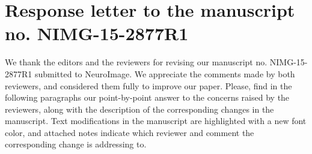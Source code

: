 \documentclass[9pt]{memoir}
\begin{document}
\hypersetup{linkcolor=black!60, citecolor=black!60, urlcolor=black!60}

\section*{Response letter to the manuscript no. NIMG-15-2877R1}

\bigskip
\noindent We thank the editors and the reviewers for revising our manuscript no. NIMG-15-2877R1 submitted to NeuroImage.
We appreciate the comments made by both reviewers, and considered them fully to improve our paper.
Please, find in the following paragraphs our point-by-point answer to the concerns raised by the reviewers,
  along with the description of the corresponding changes in the manuscript.
Text modifications in the manuscript are highlighted with a new font color, and attached notes indicate 
  which reviewer and comment the corresponding change is addressing to.

\bigskip
\bigskip
\end{document}
